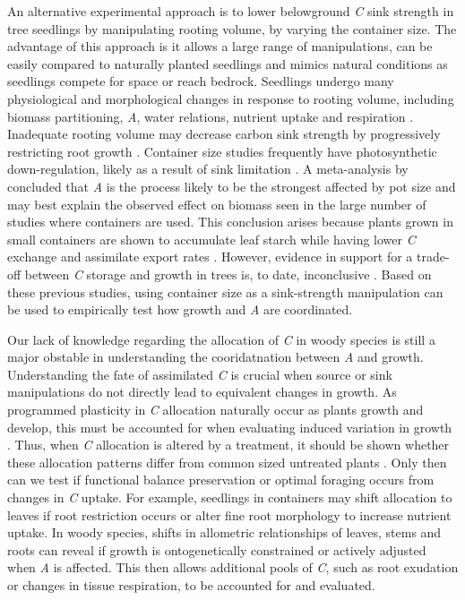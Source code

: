 \documentclass[a4paper]{article}\usepackage[]{graphicx}\usepackage[]{color}
\begin{document}
An alternative experimental approach is to lower belowground \textit{C} sink strength in tree seedlings by manipulating rooting volume, by varying the container size. The advantage of this approach is it allows a large range of manipulations, can be easily compared to naturally planted seedlings and mimics natural conditions as seedlings compete for space or reach bedrock. Seedlings undergo many physiological and morphological changes in response to rooting volume, including biomass partitioning, \textit{A}, water relations, nutrient uptake and respiration \citep[and references therein]{nesmith1998effect}. Inadequate rooting volume may decrease carbon sink strength by progressively restricting root growth \citep{thomas1991root}.  Container size studies frequently have photosynthetic down-regulation, likely as a result of sink limitation \citep{arp1991effects, mcconnaughay1991physical, gunderson1994photosynthetic, sage1994acclimation, maina2002intra, ronchi2006growth}. A meta-analysis by \citet{poorter2012pot} concluded that \textit{A} is the process likely to be the strongest affected by pot size and may best explain the observed effect on biomass seen in the large number of studies where containers are used. This conclusion arises because plants grown in small containers are shown to accumulate leaf starch while having lower \textit{C} exchange and assimilate export rates \citep{robbins1988effect}. However, evidence in support for a trade-off between \textit{C} storage and growth in trees is, to date, inconclusive \citep{palacio2014does}. Based on these previous studies, using container size as a sink-strength manipulation can be used to empirically test how growth and \textit{A} are coordinated.

Our lack of knowledge regarding the allocation of \textit{C} in woody species is still a major obstable in understanding the cooridatnation between  \textit{A} and growth. Understanding the fate of assimilated \textit{C} is crucial when source or sink manipulations do not directly lead to equivalent changes in growth. As programmed plasticity in \textit{C} allocation naturally occur as plants growth and develop, this must be accounted for when evaluating induced variation in growth \citep{wright2002interpreting}. Thus, when \textit{C} allocation is altered by a treatment, it should be shown whether these allocation patterns differ from common sized untreated plants \citep{reich2002root, poorter2012biomass}. Only then can we test if functional balance preservation or optimal foraging occurs from changes in \textit{C} uptake. For example, seedlings in containers may shift allocation to leaves if root restriction occurs or alter fine root morphology to increase nutrient uptake. In woody species, shifts in allometric relationships of leaves, stems and roots can reveal if growth is ontogenetically constrained or actively adjusted when \textit{A} is affected. This then allows additional pools of \textit{C}, such as root exudation or changes in tissue respiration, to be accounted for and evaluated.
\end{document}
